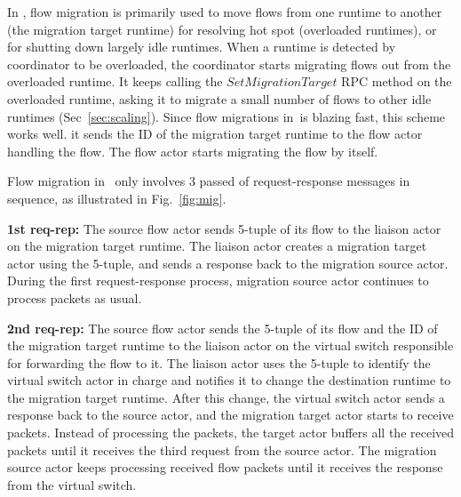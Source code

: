 In \nfactor, flow migration is primarily used to move flows from one runtime to another (the migration target runtime) for resolving hot spot (overloaded runtimes), or for shutting down largely idle runtimes. When a runtime is detected by coordinator to be overloaded, the coordinator starts migrating flows out from the overloaded runtime. It keeps calling the $SetMigrationTarget$ RPC method on the overloaded runtime, asking it to migrate a small number of flows to other idle runtimes (Sec~\ref{sec:scaling}). Since flow migrations in~\nfactor is blazing fast, this scheme works well. %
 it sends the ID of the migration target runtime to the flow actor handling the flow. The flow actor starts migrating the flow by itself. %


Flow migration in \nfactor~only involves 3 passed of request-response messages in sequence, as illustrated in Fig.~\ref{fig:mig}.



\textbf{1st req-rep:} The source flow actor sends 5-tuple of its flow to the liaison actor on the migration target runtime. The liaison actor creates a migration target actor using the 5-tuple, and sends a response back to the migration source actor. During the first request-response process, migration source actor continues to process packets as usual.

\textbf{2nd req-rep:} The source flow actor sends the 5-tuple of its flow and the ID of the migration target runtime to the liaison actor on the virtual switch responsible for forwarding the flow to it. The liaison actor uses the 5-tuple to identify the virtual switch actor in charge and notifies it to change the destination runtime to the migration target runtime. After this change, the virtual switch actor sends a response back to the source actor, and the migration target actor starts to receive packets. Instead of processing the packets, the target actor buffers all the received packets until it receives the third request from the source actor. The migration source actor keeps processing received flow packets until it receives the response from the virtual switch.

